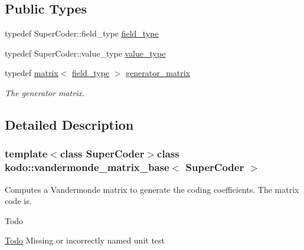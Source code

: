 \subsection*{Public Types}
\begin{DoxyCompactItemize}
\item 
typedef Super\-Coder\-::field\-\_\-type \hyperlink{classkodo_1_1vandermonde__matrix__base_a347bf0cce48328699ba6152ab90457fe}{field\-\_\-type}
\begin{DoxyCompactList}\small\item\em \end{DoxyCompactList}\item 
typedef Super\-Coder\-::value\-\_\-type \hyperlink{classkodo_1_1vandermonde__matrix__base_a46b460b3cca168d1d54b88a0071a9822}{value\-\_\-type}
\begin{DoxyCompactList}\small\item\em \end{DoxyCompactList}\item 
\hypertarget{classkodo_1_1vandermonde__matrix__base_ad6151129e0883cfa9052748a4f89cf3c}{typedef \hyperlink{classkodo_1_1matrix}{matrix}$<$ \hyperlink{classkodo_1_1vandermonde__matrix__base_a347bf0cce48328699ba6152ab90457fe}{field\-\_\-type} $>$ \hyperlink{classkodo_1_1vandermonde__matrix__base_ad6151129e0883cfa9052748a4f89cf3c}{generator\-\_\-matrix}}\label{classkodo_1_1vandermonde__matrix__base_ad6151129e0883cfa9052748a4f89cf3c}

\begin{DoxyCompactList}\small\item\em The generator matrix. \end{DoxyCompactList}\end{DoxyCompactItemize}


\subsection{Detailed Description}
\subsubsection*{template$<$class Super\-Coder$>$class kodo\-::vandermonde\-\_\-matrix\-\_\-base$<$ Super\-Coder $>$}

Computes a Vandermonde matrix to generate the coding coefficients. The matrix code is. 

\begin{DoxyRefDesc}{Todo}
\item[\hyperlink{todo__todo000051}{Todo}]Missing or incorrectly named unit test \end{DoxyRefDesc}


